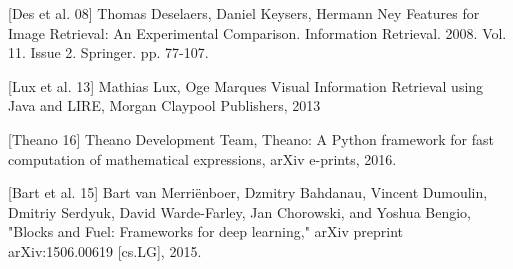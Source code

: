 [Des et al. 08] Thomas Deselaers, Daniel Keysers, Hermann Ney Features for Image Retrieval: An Experimental Comparison. Information Retrieval. 2008. Vol. 11. Issue 2. Springer. pp. 77-107.

[Lux et al. 13] Mathias Lux, Oge Marques Visual Information Retrieval using Java and LIRE, Morgan Claypool Publishers, 2013


[Theano 16] Theano Development Team, Theano: A {Python} framework for fast computation of mathematical expressions, arXiv e-prints, 2016.

[Bart et al. 15] Bart van Merriënboer, Dzmitry Bahdanau, Vincent Dumoulin, Dmitriy Serdyuk, David Warde-Farley, Jan Chorowski, and Yoshua Bengio, "Blocks and Fuel: Frameworks for deep learning," arXiv preprint arXiv:1506.00619 [cs.LG], 2015.
